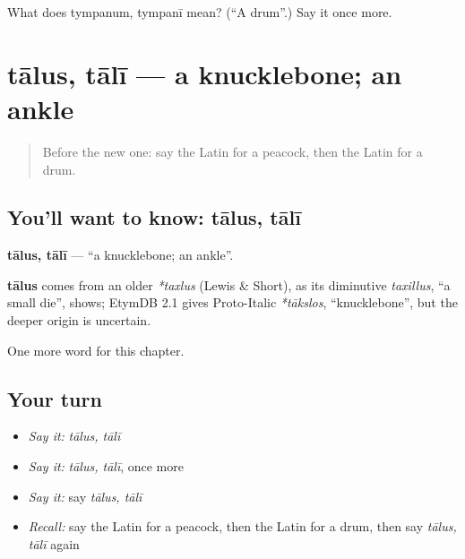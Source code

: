 \begin{tcolorbox}[breakable,colback=teal!4,colframe=teal!35!black,title={Before you move on}]
What does tympanum, tympanī mean? (\textquotedblleft{}A drum\textquotedblright{}.) Say it once more.
\end{tcolorbox}
\section[tālus, tālī]{tālus, tālī — a knucklebone; an ankle}

\label{lesson:LA-C193-talus}



\begin{quote}
Before the new one: say the Latin for a peacock, then the Latin for a drum.
\end{quote}

\subsection*{You'll want to know: tālus, tālī}
\textbf{tālus, tālī} — \textquotedblleft{}a knucklebone; an ankle\textquotedblright{}.

\begin{cousinweb}
\textbf{tālus} comes from an older \emph{*taxlus} (Lewis \& Short), as its diminutive \emph{taxillus}, \textquotedblleft{}a small die\textquotedblright{}, shows; EtymDB 2.1 gives Proto-Italic \emph{*tākslos}, \textquotedblleft{}knucklebone\textquotedblright{}, but the deeper origin is uncertain.
\end{cousinweb}

\begin{grammarlens}[title={What you've built}]
One more word for this chapter.
\end{grammarlens}

\subsection*{Your turn}
\begin{itemize}
\raggedright
  \item \emph{Say it:} \emph{tālus, tālī}
  \item \emph{Say it:} \emph{tālus, tālī}, once more
  \item \emph{Say it:} say \emph{tālus, tālī}
  \item \emph{Recall:} say the Latin for a peacock, then the Latin for a drum, then say \emph{tālus, tālī} again
\end{itemize}

